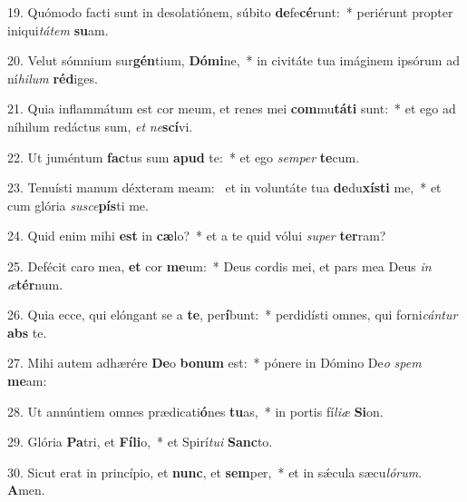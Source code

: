 19. Quómodo facti sunt in desolatiónem, súbito \textbf{de}fe\textbf{cé}runt:~*  periérunt propter iniqui\textit{tá}\textit{tem} \textbf{su}am.\

20. Velut sómnium sur\textbf{gén}tium, \textbf{Dó}\textbf{mi}ne,~*  in civitáte tua imáginem ipsórum ad ní\textit{hi}\textit{lum} \textbf{réd}iges.\

21. Quia inflammátum est cor meum, et renes mei \textbf{com}mu\textbf{tá}\textbf{ti} sunt:~*  et ego ad níhilum redáctus sum, \textit{et} \textit{ne}\textbf{scí}vi.\

22. Ut juméntum \textbf{fac}tus sum \textbf{a}\textbf{pud} te:~*  et ego \textit{sem}\textit{per} \textbf{te}cum.\

23. Tenuísti manum déxteram meam: \dag\  et in voluntáte tua \textbf{de}du\textbf{xís}\textbf{ti} me,~*  et cum glória \textit{su}\textit{sce}\textbf{pís}ti me.\

24. Quid enim mihi \textbf{est} in \textbf{cæ}lo?~*  et a te quid vólui \textit{su}\textit{per} \textbf{ter}ram?\

25. Defécit caro mea, \textbf{et} cor \textbf{me}um:~*  Deus cordis mei, et pars mea Deus \textit{in} \textit{æ}\textbf{tér}num.\

26. Quia ecce, qui elóngant se a \textbf{te}, per\textbf{í}bunt:~*  perdidísti omnes, qui forni\textit{cán}\textit{tur} \textbf{abs} te.\

27. Mihi autem adhærére \textbf{De}o \textbf{bo}\textbf{num} est:~*  pónere in Dómino De\textit{o} \textit{spem} \textbf{me}am:\

28. Ut annúntiem omnes prædicati\textbf{ó}nes \textbf{tu}as,~*  in portis fí\textit{li}\textit{æ} \textbf{Si}on.\

29. Glória \textbf{Pa}tri, et \textbf{Fí}\textbf{li}o,~*  et Spirí\textit{tu}\textit{i} \textbf{Sanc}to.\

30. Sicut erat in princípio, et \textbf{nunc}, et \textbf{sem}per,~*  et in sǽcula sæcu\textit{ló}\textit{rum}. \textbf{A}men.\

